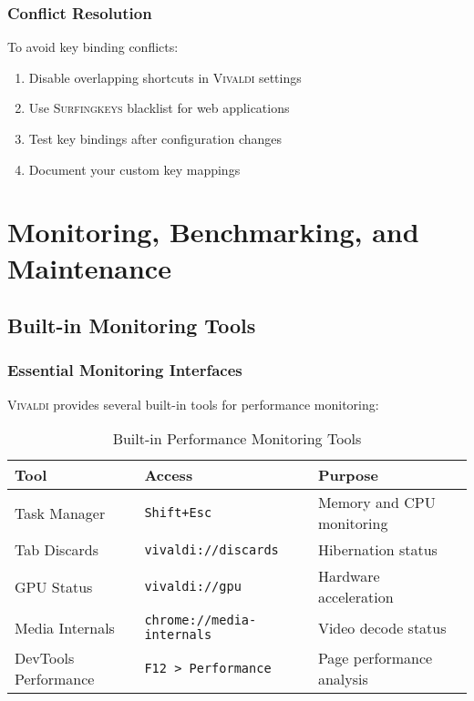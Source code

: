 \documentclass[11pt,a4paper,oneside]{book}
\newcommand{\vivaldi}{\textsc{Vivaldi}}
\newcommand{\surfingkeys}{\textsc{Surfingkeys}}
\newcommand{\keystroke}[1]{\texttt{\color{primaryblue}#1}}
\begin{document}
\subsection{Conflict Resolution}

To avoid key binding conflicts:

\begin{enumerate}
    \item Disable overlapping shortcuts in \vivaldi{} settings
    \item Use \surfingkeys{} blacklist for web applications
    \item Test key bindings after configuration changes
    \item Document your custom key mappings
\end{enumerate}

\chapter{Monitoring, Benchmarking, and Maintenance}

\section{Built-in Monitoring Tools}

\subsection{Essential Monitoring Interfaces}

\vivaldi{} provides several built-in tools for performance monitoring:

\begin{table}[h]
\centering
\begin{tabular}{@{}lll@{}}
\toprule
\textbf{Tool} & \textbf{Access} & \textbf{Purpose} \\
\midrule
Task Manager & \keystroke{Shift+Esc} & Memory and CPU monitoring \\
Tab Discards & \keystroke{vivaldi://discards} & Hibernation status \\
GPU Status & \keystroke{vivaldi://gpu} & Hardware acceleration \\
Media Internals & \keystroke{chrome://media-internals} & Video decode status \\
DevTools Performance & \keystroke{F12 > Performance} & Page performance analysis \\
\bottomrule
\end{tabular}
\caption{Built-in Performance Monitoring Tools}
\end{table}
\end{document}
